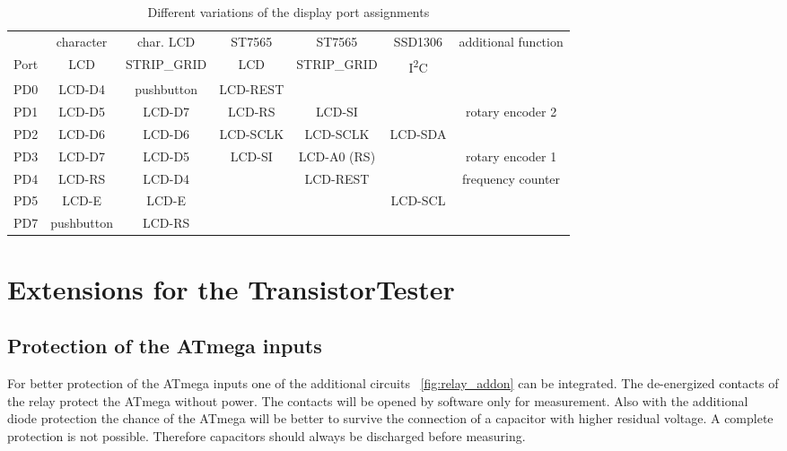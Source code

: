 \begin{table}[H]
  \begin{center}
    \begin{tabular}{| c || c | c | c | c | c | c |}
    \hline
           & character  & char. LCD    & ST7565     & ST7565       & SSD1306     & additional function \\
      Port &   LCD      & STRIP\_GRID  &   LCD      & STRIP\_GRID  &   I\textsuperscript{2}C       & \\
    \hline
    \hline
    PD0    &  LCD-D4    &  pushbutton  &  LCD-REST    &            &           & \\
    \hline
    PD1    &  LCD-D5    &  LCD-D7      &  LCD-RS      & LCD-SI     &           &  rotary encoder 2  \\
    \hline
    PD2    &  LCD-D6    &  LCD-D6      &  LCD-SCLK    & LCD-SCLK   &  LCD-SDA  & \\
    \hline
    PD3    &  LCD-D7    &  LCD-D5      &  LCD-SI      & LCD-A0 (RS) &           & rotary encoder 1 \\
    \hline
    PD4    &  LCD-RS    &  LCD-D4      &              & LCD-REST    &           & frequency counter \\
    \hline
    PD5    &  LCD-E     &  LCD-E       &              &             &  LCD-SCL  & \\
    \hline
    PD7    & pushbutton &  LCD-RS      &              &             &           &  \\
    \hline
    \end{tabular}
  \end{center}
  \caption{Different variations of the display port assignments}
  \label{tab:grid-change}
\end{table}

\section {Extensions for the TransistorTester}

\subsection{Protection of the ATmega inputs}

For better protection of the ATmega inputs one of the additional circuits~ \ref{fig:relay_addon} 
can be integrated. The de-energized contacts of the relay protect the ATmega without power.
The contacts will be opened by software only for measurement.
Also with the additional diode protection the chance of the ATmega will be better to survive the connection
of a capacitor with higher residual voltage.
A complete protection is not possible. Therefore capacitors should always be discharged before measuring.

